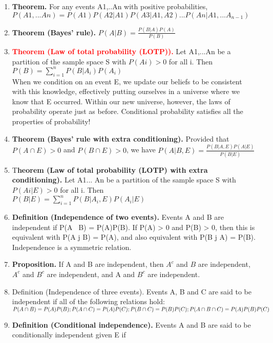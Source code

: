 \documentclass[11pt]{article}
\begin{document}
\begin{enumerate}
\begin{enumerate}
	\item \textbf{Theorem.} For any events A1,..An with positive probabilities,\\
	$P(A1,...An) = P(A1)P(A2|A1)P(A3|A1,A2)...P(An|A1,...A_{n-1})$
	\item\textbf{ Theorem (Bayes’ rule).}
	$P(A|B) = \frac{P(B|A)P(A)}{P(B)}$
	\item \textcolor{red}{\textbf{Theorem (Law of total probability (LOTP)).}} Let A1,...An be a partition of the sample space S with
	$P(Ai) > 0$ for all i. Then\\
	$P(B) = \sum_{i=1}^{n}P(B|A_i)P(A_i)$\\
	When we condition on an event E, we update our beliefs
	to be consistent with this knowledge, effectively putting ourselves in a universe where we know that E
	occurred. Within our new universe, however, the laws of probability operate just as before. Conditional
	probability satisfies all the properties of probability!
	\item\textbf{ Theorem (Bayes’ rule with extra conditioning). }Provided that $P(A\cap E) > 0$ and $P(B \cap E) > 0$, we have
	$P(A | B, E) =
	\frac{P(B | A, E)P(A | E)}
	{P(B | E)}$
	\item T\textbf{heorem (Law of total probability (LOTP) with extra conditioning).} Let A1... An be a partition of the
	sample space S with $P(Ai | E) > 0$ for all i. Then \\
	$P(B|E) = \sum_{i=1}^{n}P(B|A_i,E)P(A_i|E)$
	\item\textbf{ Definition (Independence of two events).} Events A and B are independent if P(A \ B) = P(A)P(B). If
	P(A) > 0 and P(B) > 0, then this is equivalent with P(A j B) = P(A), and also equivalent with P(B j A) =
	P(B). Independence is a symmetric relation.
	\item \textbf{Proposition.} If A and B are independent, then $A^c$ and $B$ are independent, $A^c$ and $B^c$ are independent, and
	A and $B^c$ are independent.
	\item Definition (Independence of three events). Events A, B and C are said to be independent if all of the
	following relations hold:\\
	$P(A \cap B) = P(A)P(B);\\
	P(A \cap C) = P(A)P(C);\\
	P(B \cap C) = P(B)P(C);\\
	P(A \cap B \cap C) = P(A)P(B)P(C)$
	\item \textbf{Definition (Conditional independence).} Events A and B are said to be conditionally independent given E if

\end{enumerate}
\end{enumerate}
\end{document}
